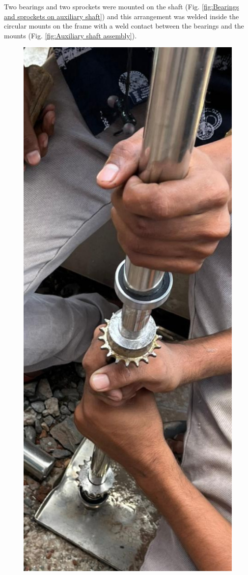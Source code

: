 Two bearings and two sprockets were mounted on the shaft  (Fig. \ref{fig:Bearings and sprockets on auxiliary shaft}) and this arrangement was welded inside the circular mounts on the frame with a weld contact between the bearings and the mounts (Fig. \ref{fig:Auxiliary shaft assembly}).

\begin{figure}[H]
  \centering
    \begin{minipage}{0.185\textwidth}
    \centering
      \includegraphics[width=1\textwidth]{bea spro sha.jpg}

\end{minipage}
\end{figure}
